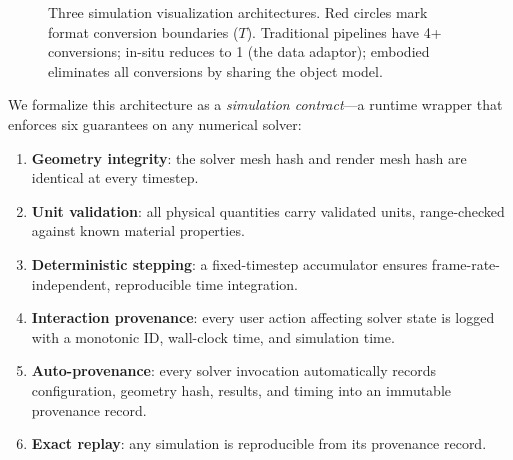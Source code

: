 \documentclass[journal]{IEEEtran}
\begin{document}
\begin{figure}[t]
  \centering
  \caption{Three simulation visualization architectures. Red circles mark
    format conversion boundaries ($T$). Traditional pipelines have 4+
    conversions; in-situ reduces to 1 (the data adaptor); embodied
    eliminates all conversions by sharing the object model.}
  \label{fig:pipelines}
\end{figure}

We formalize this architecture as a \emph{simulation contract}---a runtime
wrapper that enforces six guarantees on any numerical solver:

\begin{enumerate}
  \item \textbf{Geometry integrity}: the solver mesh hash and render mesh
    hash are identical at every timestep.
  \item \textbf{Unit validation}: all physical quantities carry validated
    units, range-checked against known material properties.
  \item \textbf{Deterministic stepping}: a fixed-timestep accumulator
    ensures frame-rate-independent, reproducible time integration.
  \item \textbf{Interaction provenance}: every user action affecting solver
    state is logged with a monotonic ID, wall-clock time, and simulation
    time.
  \item \textbf{Auto-provenance}: every solver invocation automatically
    records configuration, geometry hash, results, and timing into an
    immutable provenance record.
  \item \textbf{Exact replay}: any simulation is reproducible from its
    provenance record.
\end{enumerate}
\end{document}
